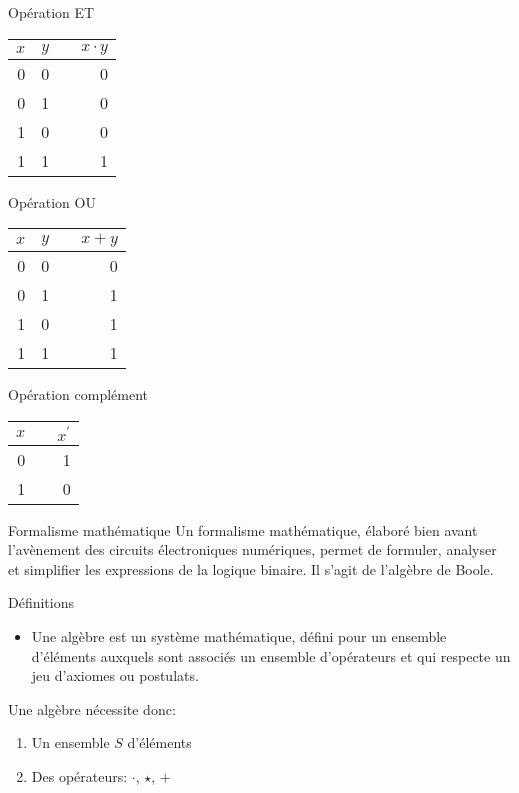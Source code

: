 \documentclass[presentation]{beamer}
\begin{document}
\begin{frame}[label={sec:orgac18b93}]{Opération ET}
\begin{center}
\begin{tabular}{rrlr}
\(x\) & \(y\) &  & \(x \cdot y\)\\
\hline
0 & 0 &  & 0\\
0 & 1 &  & 0\\
1 & 0 &  & 0\\
1 & 1 &  & 1\\
\end{tabular}
\end{center}
\end{frame}

\begin{frame}[label={sec:org2b55d25}]{Opération OU}
\begin{center}
\begin{tabular}{rrlr}
\(x\) & \(y\) &  & \(x + y\)\\
\hline
0 & 0 &  & 0\\
0 & 1 &  & 1\\
1 & 0 &  & 1\\
1 & 1 &  & 1\\
\end{tabular}
\end{center}
\end{frame}

\begin{frame}[label={sec:org88af66c}]{Opération complément}
\begin{center}
\begin{tabular}{rlr}
\(x\) &  & \(x^{\prime}\)\\
\hline
0 &  & 1\\
1 &  & 0\\
\end{tabular}
\end{center}
\end{frame}

\begin{frame}[label={sec:org198c947}]{Formalisme mathématique}
Un formalisme mathématique, élaboré bien avant l'avènement des circuits électroniques numériques, permet de formuler, analyser et simplifier les expressions de la logique binaire. Il s'agit de l'algèbre de Boole.

\begin{block}{Définitions}
\begin{itemize}
\item Une algèbre est un système mathématique, défini pour un ensemble d'éléments auxquels sont associés un ensemble d'opérateurs et qui respecte un jeu d'axiomes ou postulats.
\end{itemize}

Une algèbre nécessite donc:

\begin{enumerate}
\item Un ensemble \(S\) d'éléments

\item Des opérateurs: \(\cdot\), \(\star\), \(+\)
\end{enumerate}
\end{block}
\end{frame}
\end{document}

